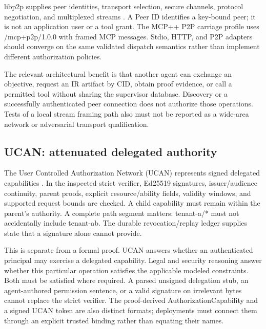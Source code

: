 \documentclass{article}
\begin{document}
libp2p supplies peer identities, transport selection, secure channels, protocol negotiation, and multiplexed streams \citep{libp2p}. A Peer ID identifies a key-bound peer; it is not an application user or a tool grant. The MCP++ P2P carriage profile uses /mcp+p2p/1.0.0 with framed MCP messages. Stdio, HTTP, and P2P adapters should converge on the same validated dispatch semantics rather than implement different authorization policies.

The relevant architectural benefit is that another agent can exchange an objective, request an IR artifact by CID, obtain proof evidence, or call a permitted tool without sharing the supervisor database. Discovery or a successfully authenticated peer connection does not authorize those operations. Tests of a local stream framing path also must not be reported as a wide-area network or adversarial transport qualification.

\subsection{UCAN: attenuated delegated authority}

The User Controlled Authorization Network (UCAN) represents signed delegated capabilities \citep{ucan}. In the inspected strict verifier, Ed25519 signatures, issuer/audience continuity, parent proofs, explicit resource/ability fields, validity windows, and supported request bounds are checked. A child capability must remain within the parent's authority. A complete path segment matters: tenant-a/* must not accidentally include tenant-ab. The durable revocation/replay ledger supplies state that a signature alone cannot provide.

This is separate from a formal proof. UCAN answers whether an authenticated principal may exercise a delegated capability. Legal and security reasoning answer whether this particular operation satisfies the applicable modeled constraints. Both must be satisfied where required. A parsed unsigned delegation stub, an agent-authored permission sentence, or a valid signature on irrelevant bytes cannot replace the strict verifier. The proof-derived AuthorizationCapability and a signed UCAN token are also distinct formats; deployments must connect them through an explicit trusted binding rather than equating their names.
\end{document}
